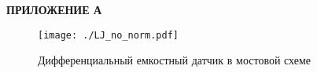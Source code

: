 \newpage
\begin{flushleft}
  \textbf{\large ПРИЛОЖЕНИЕ А}
\end{flushleft}

\begin{figure}[ht]
  \centering
  \texttt{[image: ./LJ\_no\_norm.pdf]}
  \label{fig:5_2}
	\caption{Дифференциальный емкостный датчик в мостовой схеме}

\end{figure}
